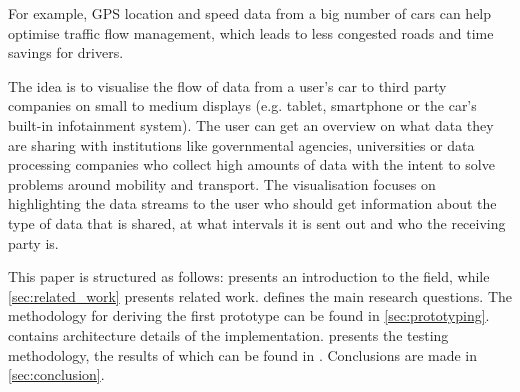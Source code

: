 \documentclass[../paper.tex]{subfiles}
\begin{document}
  For example, GPS location and speed data from a big number of cars can help
  optimise traffic flow management, which leads to less congested roads and
  time savings for drivers.


  The idea is to visualise the flow of data from a user’s car to third party
  companies on small to medium displays (e.g. tablet, smartphone or the car’s
  built-in infotainment system). The user can get an overview on what data they
  are sharing with institutions like governmental agencies, universities or
  data processing companies who collect high amounts of data with the intent to
  solve problems around mobility and transport. The visualisation
  focuses on highlighting the data streams to the user who should get
  information about the type of data that is shared, at what intervals it is
  sent out and who the receiving party is.

  This paper is structured as follows:  presents an
  introduction to the field, while \cref{sec:related_work} presents related
  work.  defines the main research questions. The
  methodology for deriving the first prototype can be found in
  \cref{sec:prototyping}.  contains architecture
  details of the implementation.  presents the
  testing methodology, the results of which can be found in .
  Conclusions are made in \cref{sec:conclusion}.
\end{document}

